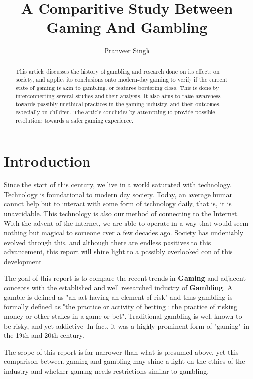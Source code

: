 \documentclass{article}
\title{A Comparitive Study Between Gaming And Gambling}
\author{Pranveer Singh}
\begin{document}
\maketitle



\begin{abstract}

This article discusses the history of gambling and research done on its effects on society, and applies its conclusions onto modern-day gaming to verify if the current state of gaming is akin to gambling, or features bordering close. This is done by interconnecting several studies and their analysis. It also aims to raise awareness towards possibly unethical practices in the gaming industry, and their outcomes, especially on children. The article concludes by attempting to provide possible resolutions towards a safer gaming experience.

\end{abstract}

\section{Introduction}
Since the start of this century, we live in a world saturated with technology. Technology is foundational to modern day society. Today, an average human cannot help but to interact with some form of technology daily, that is, it is unavoidable.
This technology is also our method of connecting to the Internet. With the advent of the internet, we are able to operate in a way that would seem nothing but magical to someone over a few decades ago. Society has undeniably evolved through this, and although there are endless positives to this advancement, this report will shine light to a possibly overlooked con of this development.\cite{walker1992psychology}

The goal of this report is to compare the recent trends in \textbf{Gaming} and adjacent concepts with the established and well researched industry of \textbf{Gambling}. A gamble is defined as "an act having an element of risk" and thus gambling is formally defined as "the practice or activity of betting : the practice of risking money or other stakes in a game or bet". Traditional gambling is well known to be risky, and yet addictive. In fact, it was a highly prominent form of "gaming" in the 19th and 20th century. \cite{parker2008problem} \cite{dowling2005electronic}

The scope of this report is far narrower than what is presumed above, yet this comparison between gaming and gambling may shine a light on the ethics of the industry and whether gaming needs restrictions similar to gambling.
\end{document}
